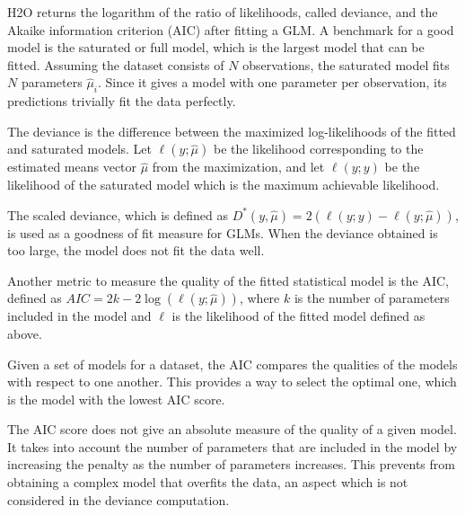 H2O returns the logarithm of the ratio of likelihoods, called deviance, and the Akaike information criterion (AIC) after fitting a GLM. A benchmark for a good model is the saturated or full model, which is the largest model that can be fitted. Assuming the dataset consists of $N$ observations, the saturated model fits $N$ parameters $\hat{\mu}_i$. Since it gives a model with one parameter per observation, its predictions trivially fit the data perfectly.

The deviance is the difference between the maximized log-likelihoods of the fitted and saturated models. Let $\ell(y;\hat{\mu})$ be the likelihood corresponding to the estimated means vector $\hat{\mu}$ from the maximization, and let $\ell(y;y)$ be the likelihood of the saturated model which is the maximum achievable likelihood. 

The scaled deviance, which is defined as $ D^*(y,\hat{\mu}) = 2 (\ell(y;y)-\ell(y;\hat{\mu}) )$,
is used as a goodness of fit measure for GLMs. When the deviance obtained is too large, the model does not fit the data well. 

%

Another metric to measure the quality of the fitted statistical model is the AIC, defined as $AIC = 2k -2\log(\ell(y;\hat{\mu}))$, where $k$ is the number of parameters included in the model and $\ell$ is the likelihood of the fitted model defined as above.

 Given a set of models for a dataset, the AIC compares the qualities of the models with respect to one another. This provides a way to select the optimal one, which is the model with the lowest AIC score. 

The AIC score does not give an absolute measure of the quality of a given model. It takes into account the number of parameters that are included in the model by increasing the penalty as the number of parameters increases. This prevents from obtaining a complex model that overfits the data, an aspect which is not considered in the deviance computation.
 
%
%

